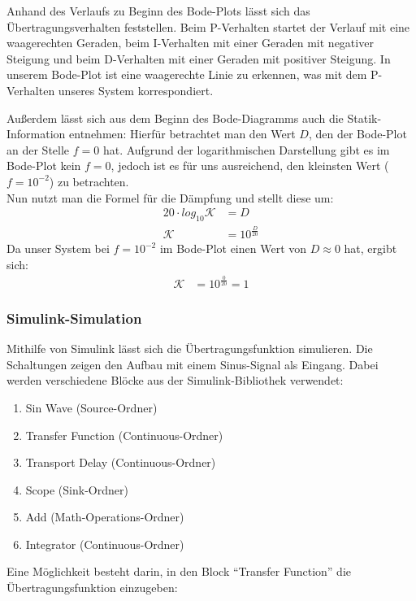  Anhand des Verlaufs zu Beginn des Bode-Plots lässt sich das Übertragungsverhalten feststellen. Beim P-Verhalten startet der Verlauf mit eine waagerechten Geraden, beim I-Verhalten mit einer Geraden mit negativer Steigung und beim D-Verhalten mit einer Geraden mit positiver Steigung. 
 In unserem Bode-Plot ist eine waagerechte Linie zu erkennen, was mit dem P-Verhalten unseres System korrespondiert.

 Außerdem lässt sich aus dem Beginn des Bode-Diagramms auch die Statik-Information entnehmen: Hierfür betrachtet man den Wert $D$, den der Bode-Plot an der Stelle $f = 0$ hat. Aufgrund der logarithmischen Darstellung gibt es im Bode-Plot kein $f = 0$, jedoch ist es für uns ausreichend, den kleinsten Wert ($f = 10^{-2}$) zu betrachten. \\
 Nun nutzt man die Formel für die Dämpfung und stellt diese um:
 \begin{align*}
    20 \cdot log_{10} \mathcal{K} &= D \\
    \mathcal{K} &= 10^{\frac{D}{20}}
 \end{align*}
 Da unser System bei $f = 10^{-2}$ im Bode-Plot einen Wert von $D \approx 0$ hat, ergibt sich:
 \begin{align*}
    \mathcal{K} &= 10^{\frac{0}{20}} = 1
\end{align*}

\subsubsection{Simulink-Simulation}
Mithilfe von Simulink lässt sich die Übertragungsfunktion simulieren. Die Schaltungen zeigen den Aufbau mit einem Sinus-Signal als Eingang.
Dabei werden verschiedene Blöcke aus der Simulink-Bibliothek verwendet:
\begin{enumerate}
    \item Sin Wave (Source-Ordner)
    \item Transfer Function (Continuous-Ordner)
    \item Transport Delay (Continuous-Ordner)
    \item Scope (Sink-Ordner)
    \item Add (Math-Operations-Ordner)
    \item Integrator (Continuous-Ordner)
\end{enumerate}

Eine Möglichkeit besteht darin, in den Block \enquote{Transfer Function} die Übertragungsfunktion einzugeben:

